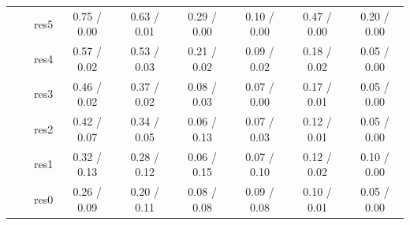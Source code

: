 \begin{tabular}{lllcccccc}
 &  & res5 & 0.75 / 0.00 & 0.63 / 0.01 & 0.29 / 0.00 & 0.10 / 0.00 & 0.47 / 0.00 & 0.20 / 0.00\\
 &  & res4 & 0.57 / 0.02 & 0.53 / 0.03 & 0.21 / 0.02 & 0.09 / 0.02 & 0.18 / 0.02 & 0.05 / 0.00\\
 &  & res3 & 0.46 / 0.02 & 0.37 / 0.02 & 0.08 / 0.03 & 0.07 / 0.00 & 0.17 / 0.01 & 0.05 / 0.00\\
 &  & res2 & 0.42 / 0.07 & 0.34 / 0.05 & 0.06 / 0.13 & 0.07 / 0.03 & 0.12 / 0.01 & 0.05 / 0.00\\
 &  & res1 & 0.32 / 0.13 & 0.28 / 0.12 & 0.06 / 0.15 & 0.07 / 0.10 & 0.12 / 0.02 & 0.10 / 0.00\\
 &  & res0 & 0.26 / 0.09 & 0.20 / 0.11 & 0.08 / 0.08 & 0.09 / 0.08 & 0.10 / 0.01 & 0.05 / 0.00\\
\bottomrule
\end{tabular}
